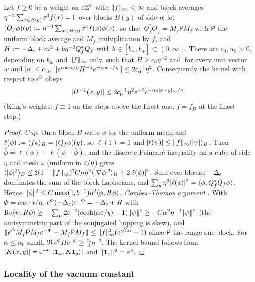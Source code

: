 \begin{lemma}[decay at $A=0$]\label{app:a04:lem:CT}
Let $f\ge0$ be a weight on $\varepsilon\mathbb Z^3$ with $\lVert f\rVert_\infty<\infty$ and block averages $\eta^{-3}\sum_{x\in B(y)}\varepsilon^3f(x)=1$ over blocks $B(y)$ of side $\eta$; let $(Q_f\phi)(y):=\eta^{-3}\sum_{x\in B(y)}\varepsilon^3f(x)\phi(x)$, so that $Q_f^*Q_f=M_f\mathsf PM_f$ with $\mathsf P$ the uniform block average and $M_f$ multiplication by $f$, and $H:=-\Delta_{\varepsilon}+m^2+b\eta^{-2}Q_f^*Q_f$ with $b\in[b_-,b_+]\subset(0,\infty)$. There are $c_0,\alpha_0>0$, depending on $b_\pm$ and $\lVert f\rVert_\infty$ only, such that $H\ge c_0\eta^{-2}$ and, for every unit vector $w$ and $|\alpha|\le\alpha_0$, $\lVert e^{\alpha w\cdot x/\eta}H^{-1}e^{-\alpha w\cdot x/\eta}\rVert\le2c_0^{-1}\eta^2$. Consequently the kernel with respect to $\varepsilon^3$ obeys
\[
|H^{-1}(x,y)|\le2c_0^{-1}\eta^2\varepsilon^{-3}e^{-\alpha_0|x-y|_\infty/\eta}.
\]
(King's weights: $f\equiv1$ on the steps above the finest one, $f=f_D$ at the finest step.)
\end{lemma}
\begin{proof}
\emph{Gap.} On a block $B$ write $\bar\phi$ for the uniform mean and $\ell(\phi):=\langle f\phi\rangle_B=(Q_f\phi)(y)$, so $\ell(1)=1$ and $|\ell(\psi)|\le\lVert f\rVert_\infty\langle|\psi|\rangle_B$. Then $\bar\phi=\ell(\phi)-\ell(\phi-\bar\phi)$, and the discrete Poincar\'e inequality on a cube of side $\eta$ and mesh $\varepsilon$ (uniform in $\varepsilon/\eta$) gives $\langle|\phi|^2\rangle_B\le2(1+\lVert f\rVert_\infty)^2C_P\eta^2\langle|\nabla\phi|^2\rangle_B+2|\ell(\phi)|^2$. Sum over blocks: $-\Delta_{\varepsilon}$ dominates the sum of the block Laplacians, and $\sum_y\eta^3|\ell(\phi)|^2=\langle \phi,Q_f^*Q_f\phi\rangle$. Hence $\lVert \phi\rVert^2\le C\max(1,b^{-1})\eta^2\langle \phi,H\phi\rangle$. \emph{Combes--Thomas argument} \cite{CT73}. With $\Phi=\alpha w\cdot x/\eta$, $e^{\Phi}(-\Delta_{\varepsilon})e^{-\Phi}=-\Delta_{\varepsilon}+R$ with $\operatorname{Re}\langle \psi,R\psi\rangle\ge-\sum_\mu2\varepsilon^{-2}(\cosh(\alpha\varepsilon/\eta)-1)\lVert \psi\rVert^2\ge-C\alpha^2\eta^{-2}\lVert \psi\rVert^2$ (the antisymmetric part of the conjugated hopping is skew), and $\lVert e^\Phi M_f\mathsf PM_fe^{-\Phi}-M_f\mathsf PM_f\rVert\le\lVert f\rVert_\infty^2(e^{\sqrt3\alpha}-1)$ since $\mathsf P$ has range one block. For $\alpha\le\alpha_0$ small, $\Re\,e^\Phi He^{-\Phi}\ge\frac{c_0}2\eta^{-2}$. The kernel bound follows from $|K(x,y)|=\varepsilon^{-6}|\langle \mathbf 1_x,K\mathbf 1_y\rangle|$ and $\lVert \mathbf 1_x\rVert^2=\varepsilon^3$.
\end{proof}

\subsubsection{Locality of the vacuum constant}

